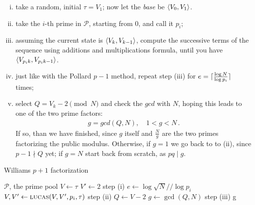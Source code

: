 \begin{enumerate}[(i)]
\item take a random, initial $\tau = V_1$; now let the \emph{base} be
  $\langle V_0, V_1\rangle$.
\item take the $i$-th prime in $\mathcal{P}$, starting from $0$, and call it
  $p_i$;
\item assuming the current state is $\langle V_k, V_{k-1}\rangle$, compute the
  successive terms of the sequence using additions and multiplications formula,
  until you have $\langle V_{p_ik}, V_{p_ik - 1}\rangle$.
\item just like with the Pollard $p-1$ method, repeat step (iii) for $e =
  \lceil\frac{\log N}{\log p_i}\rceil$ times;
\item select $Q = V_k - 2 \pmod{N}$ and check the $gcd$ with $N$, hoping this
  leads to one of the two prime factors:
\begin{align}
  g = gcd(Q, N), \quad 1 < g < N \,.
\end{align}
If so, than we have finished, since $g$ itself and $\frac{N}{g}$
are the two primes factorizing the public  modulus.
Otherwise, if $g = 1$ we go back to to (ii), since $p-1 \nmid Q$ yet;
if $g = N$ start back from scratch, as $pq \mid g$.

\end{enumerate}



\begin{algorithm}
  \caption{Williams $p+1$ factorization}
  \begin{algorithmic}[1]
    \Require $\mathcal{P}$, the prime pool
      \State $V \gets \tau$
      \State $V' \gets 2$
      \Comment step (i)
        \State $e \gets \log \sqrt{N} // \log p_i$
          \State $V, V' \gets \textsc{lucas}(V, V', p_i, \tau)$
          \Comment step (ii)
          \State $Q \gets V -2$
          \State $g \gets \gcd(Q, N)$
          \Comment step (iii)
           \Return {}
           \Return g
          \EndIf
        \EndFor
      \EndFor
    \EndFunction
  \end{algorithmic}
\end{algorithm}
